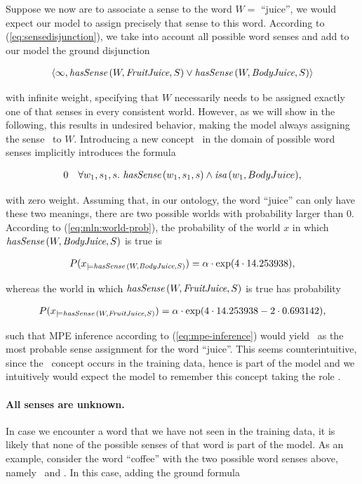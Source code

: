\documentclass[12pt,a4paper]{article}
\begin{document}
Suppose we now are to associate a sense to the word $W=$ ``juice'', 
we would expect our model to assign precisely that sense to this 
word. According to (\ref{eq:sensedisjunction}), we take into account 
all possible word senses and add to our model the ground disjunction

\begin{eqnarray}
	\left<\infty, \textit{hasSense\,}(W, \textit{FruitJuice}, S)\vee \textit{hasSense\,}(W, \textit{BodyJuice}, S)\right>\nonumber
\end{eqnarray}

with infinite weight, specifying that $W$ necessarily needs to be 
assigned exactly one of that senses in every consistent world. 
However, as we will show in the following, this results in undesired 
behavior, making the model always assigning the sense \BodyJuice\ to 
$W$. Introducing a new concept \BodyJuice\ in the domain of possible 
word senses implicitly introduces the formula

\begin{eqnarray}
	0 & &\forall w_1,s_1,s.\ \hasSense(w_1,s_1,s)\wedge\isa(w_1,BodyJuice),\nonumber
\end{eqnarray}

with zero weight. Assuming that, in our ontology, the word ``juice'' 
can only have these two meanings, there are two possible worlds with 
probability larger than 0. According to (\ref{eq:mln:world-prob}), 
the probability of the world $x$ in which $\textit{hasSense\,}(W,\textit{BodyJuice},S)$
is true is

\begin{eqnarray}
	P(x_{\models\textit{hasSense\,}(W,\textit{BodyJuice},S)})=\alpha\cdot\exp (4\cdot 14.253938), \nonumber
\end{eqnarray} 
 
whereas the world in which  $\textit{hasSense\,}(W,\textit{FruitJuice},S)$ is true has probability 
 
\begin{eqnarray}
	P(x_{\models\textit{hasSense\,}(W,\textit{FruitJuice},S)})=\alpha\cdot\exp (4\cdot 14.253938 - 2\cdot 0.693142),\nonumber
\end{eqnarray}

such that MPE inference according to (\ref{eq:mpe-inference}) would 
yield \BodyJuice\ as the most probable sense assignment for the word 
``juice''. This seems counterintuitive, since the \FruitJuice\ 
concept occurs in the training data, hence is part of the model and 
we intuitively would expect the model to remember this concept 
taking the role \Theme.

\paragraph{All senses are unknown.} In case we encounter a word that 
we have not seen in the training data, it is likely that none of the 
possible senses of that word is part of the model. As an example, 
consider the word ``coffee'' with the two possible word senses 
above, namely \Coffee\ and \CoffeePowder. In this case, adding the 
ground formula
\end{document}
